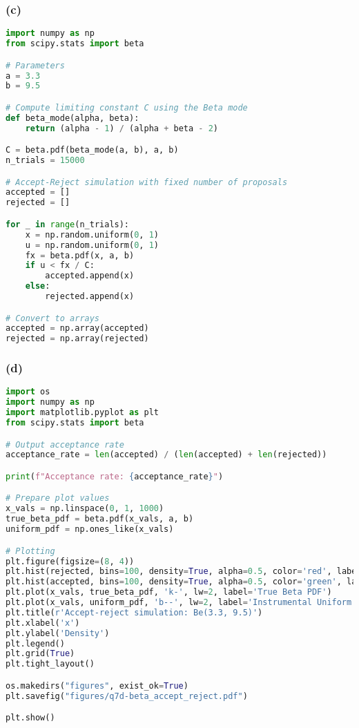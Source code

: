 \subsubsection*{(c)}

\begin{lstlisting}[language=Python]
import numpy as np
from scipy.stats import beta

# Parameters
a = 3.3
b = 9.5

# Compute limiting constant C using the Beta mode
def beta_mode(alpha, beta):
    return (alpha - 1) / (alpha + beta - 2)

C = beta.pdf(beta_mode(a, b), a, b)
n_trials = 15000

# Accept-Reject simulation with fixed number of proposals
accepted = []
rejected = []

for _ in range(n_trials):
    x = np.random.uniform(0, 1)
    u = np.random.uniform(0, 1)
    fx = beta.pdf(x, a, b)
    if u < fx / C:
        accepted.append(x)
    else:
        rejected.append(x)

# Convert to arrays
accepted = np.array(accepted)
rejected = np.array(rejected)
\end{lstlisting}



\subsubsection*{(d)}

\begin{lstlisting}[language=Python]
import os
import numpy as np
import matplotlib.pyplot as plt
from scipy.stats import beta

# Output acceptance rate
acceptance_rate = len(accepted) / (len(accepted) + len(rejected))

print(f"Acceptance rate: {acceptance_rate}")

# Prepare plot values
x_vals = np.linspace(0, 1, 1000)
true_beta_pdf = beta.pdf(x_vals, a, b)
uniform_pdf = np.ones_like(x_vals)

# Plotting
plt.figure(figsize=(8, 4))
plt.hist(rejected, bins=100, density=True, alpha=0.5, color='red', label='Rejected samples')
plt.hist(accepted, bins=100, density=True, alpha=0.5, color='green', label='Accepted samples')
plt.plot(x_vals, true_beta_pdf, 'k-', lw=2, label='True Beta PDF')
plt.plot(x_vals, uniform_pdf, 'b--', lw=2, label='Instrumental Uniform PDF')
plt.title(r'Accept-reject simulation: Be(3.3, 9.5)')
plt.xlabel('x')
plt.ylabel('Density')
plt.legend()
plt.grid(True)
plt.tight_layout()

os.makedirs("figures", exist_ok=True)
plt.savefig("figures/q7d-beta_accept_reject.pdf")

plt.show()
\end{lstlisting}



